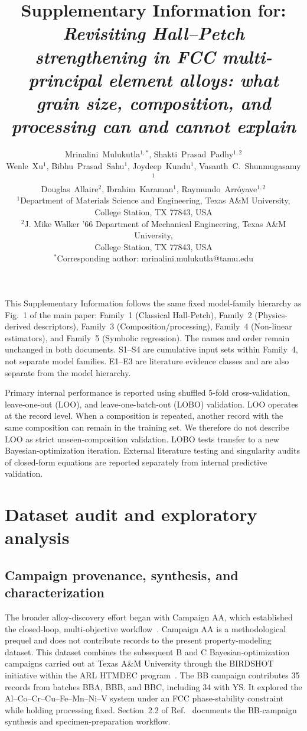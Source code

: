 \documentclass[a4paper,11pt]{article}
\title{Supplementary Information for:\\
\emph{Revisiting Hall--Petch strengthening in FCC multi-principal element alloys: what grain size, composition, and processing can and cannot explain}}
\author{Mrinalini~Mulukutla$^{1,*}$, Shakti~Prasad~Padhy$^{1,2}$ \\ 
Wenle~Xu$^{1}$, Bibhu~Prasad~Sahu$^{1}$, Joydeep~Kundu$^{1}$, Vasanth~C.~Shunmugasamy$^{1}$ \\
Douglas~Allaire$^{2}$, Ibrahim~Karaman$^{1}$, Raymundo~Arr\'{o}yave$^{1,2}$\\[0.5em]
\small $^{1}$Department of Materials Science and Engineering, Texas A\&M University,\\
\small College Station, TX 77843, USA\\
\small $^{2}$J. Mike Walker '66 Department of Mechanical Engineering, Texas A\&M University,\\
\small College Station, TX 77843, USA\\
\small $^{*}$Corresponding author: mrinalini.mulukutla@tamu.edu}
\date{}
\newcommand{\familyone}{Classical Hall-Petch}
\newcommand{\familytwo}{Physics-derived descriptors}
\newcommand{\familythree}{Composition/processing}
\newcommand{\familyfour}{Non-linear estimators}
\newcommand{\familyfive}{Symbolic regression}
\begin{document}
\maketitle
\begingroup
\sloppy
\tableofcontents
\endgroup

This Supplementary Information follows the same fixed model-family hierarchy as Fig.~1 of the main paper: Family~1 (\familyone), Family~2 (\familytwo), Family~3 (\familythree), Family~4 (\familyfour), and Family~5 (\familyfive). The names and order remain unchanged in both documents. S1--S4 are cumulative input sets within Family~4, not separate model families. E1--E3 are literature evidence classes and are also separate from the model hierarchy.

Primary internal performance is reported using shuffled 5-fold cross-validation, leave-one-out (LOO), and leave-one-batch-out (LOBO) validation. LOO operates at the record level. When a composition is repeated, another record with the same composition can remain in the training set. We therefore do not describe LOO as strict unseen-composition validation. LOBO tests transfer to a new Bayesian-optimization iteration. External literature testing and singularity audits of closed-form equations are reported separately from internal predictive validation.

\section{Dataset audit and exploratory analysis}
\label{si:data}

\subsection{Campaign provenance, synthesis, and characterization}

The broader alloy-discovery effort began with Campaign AA, which established the closed-loop, multi-objective workflow~\cite{Hastings2025FCC}. Campaign AA is a methodological prequel and does not contribute records to the present property-modeling dataset. This dataset combines the subsequent B and C Bayesian-optimization campaigns carried out at Texas A\&M University through the BIRDSHOT initiative within the ARL HTMDEC program~\cite{Mulukutla2024BIRDSHOT,Mulukutla2026BRAVE}. The BB campaign contributes 35 records from batches BBA, BBB, and BBC, including 34 with YS. It explored the Al--Co--Cr--Cu--Fe--Mn--Ni--V system under an FCC phase-stability constraint while holding processing fixed. Section~2.2 of Ref.~\cite{Mulukutla2026BRAVE} documents the BB-campaign synthesis and specimen-preparation workflow.
\end{document}
